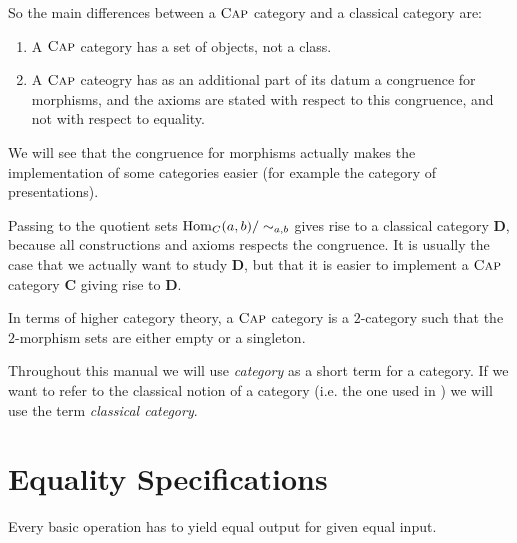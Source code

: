 So the main differences between a $\textsc{Cap}$ category and a classical category are:
\begin{enumerate}
 \item A $\textsc{Cap}$ category has a set of objects, not a class.
 \item A $\textsc{Cap}$ cateogry has as an additional part of its datum a congruence for morphisms, and the
 axioms are stated with respect to this congruence, and not with respect to equality.
\end{enumerate}

We will see that the congruence for morphisms actually makes the implementation of some categories easier (for example
the category of presentations).

\begin{remark}
 Passing to the quotient sets $\operatorname{\mathrm{Hom}}_{C}( a, b )/\sim_{a,b}$ gives rise to a classical category $\mathbf{D}$, because
 all constructions and axioms respects the congruence.
 It is usually the case that we actually want to study $\mathbf{D}$, but that it is easier to implement a $\textsc{Cap}$ category $\mathbf{C}$
 giving rise to $\mathbf{D}$.
\end{remark}

\begin{remark}
 In terms of higher category theory, a $\textsc{Cap}$ category is a $2$-category such that the $2$-morphism sets are either empty or a singleton.
\end{remark}

\begin{convention}
 Throughout this manual we will use \textit{category} as a short term for a \CapPkg category. 
 If we want to refer to the classical notion of a category (i.e. the one used in \cite{MLCWM}) we will use the term \textit{classical category}.
\end{convention}


\section{Equality Specifications}

\begin{specification}
 Every basic operation has to yield equal output for given equal input.
\end{specification}

